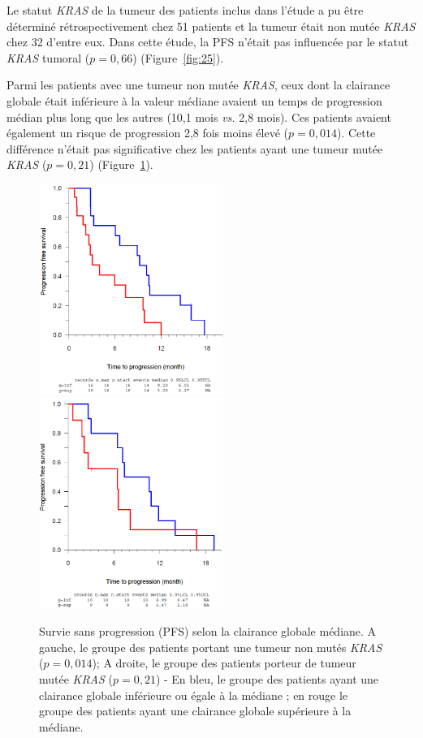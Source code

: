 Le statut \textit{KRAS} de la tumeur des patients inclus dans l'étude a pu être déterminé rétrospectivement chez 51 patients et la tumeur était non mutée \textit{KRAS} chez 32 d'entre eux. Dans cette étude, la PFS n'était pas influencée par le statut \textit{KRAS} tumoral ($p = 0,66$) (Figure~\ref{fig:25}).

Parmi les patients avec une tumeur non mutée \textit{KRAS}, ceux dont la clairance globale était inférieure à la valeur médiane avaient un temps de progression médian plus long que les autres (10,1 mois \textit{vs.} 2,8 mois). Ces patients avaient également un risque de progression 2,8 fois moins élevé ($p = 0,014$). Cette différence n'était pas significative chez les patients ayant une tumeur mutée \textit{KRAS} ($p = 0,21$) (Figure~\ref{fig:26}).
\begin{figure}[htbp]
	\centering
		\includegraphics[width=6cm]{figures/raster/FIG_26a}
		\includegraphics[width=6cm]{figures/raster/FIG_26b}
	\caption{Survie sans progression (PFS) selon la clairance globale médiane. A gauche, le groupe des patients portant une tumeur non mutés \textit{KRAS} ($p = 0,014$); A droite, le groupe des patients porteur de tumeur mutée \textit{KRAS} ($p = 0,21$) - En bleu, le groupe des patients ayant une clairance globale inférieure ou égale à la médiane ; en rouge le groupe des patients ayant une clairance globale supérieure à la médiane.}
	\label{fig:26}
\end{figure} 
